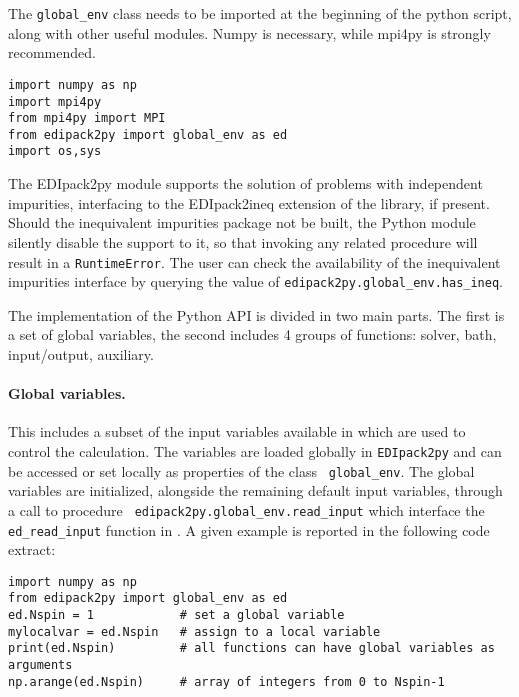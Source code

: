 \documentclass[edipack_sp.tex]{subfiles}
\begin{document}
The {\tt global\_env} class needs to be imported at the beginning
of the python script, along with other useful modules. Numpy is
necessary, while mpi4py is strongly recommended.

\begin{lstlisting}[style=mypython]
import numpy as np
import mpi4py
from mpi4py import MPI
from edipack2py import global_env as ed
import os,sys
\end{lstlisting}

The EDIpack2py module supports the solution of problems with independent
impurities, interfacing to the EDIpack2ineq extension of the
library, if present. Should the inequivalent impurities package not be
built, the Python module silently disable the support to it, so that
invoking any related procedure  will result in a {\tt RuntimeError}.
The user can check the availability of the inequivalent impurities
interface by querying the value of  {\tt edipack2py.global\_env.has\_ineq}.

The implementation of the Python API is divided in two main parts. The
first is a set of global variables, the second includes 4 groups of
functions: solver, bath, input/output, auxiliary. 

\paragraph{{\bf Global variables}.}
This includes a subset of the input variables available in \NAME which
are used to control the calculation.
The variables are loaded globally in {\tt EDIpack2py} and can be accessed
or set locally as properties of the class {\tt
  global\_env}. The global variables are initialized, alongside the remaining
default input variables, through a call to procedure {\tt
  edipack2py.global\_env.read\_input} which interface the {\tt
  ed\_read\_input} function in \NAME. 
A given example is reported in the following code extract:

\begin{lstlisting}[style=mypython]
import numpy as np
from edipack2py import global_env as ed
ed.Nspin = 1            # set a global variable
mylocalvar = ed.Nspin   # assign to a local variable
print(ed.Nspin)         # all functions can have global variables as arguments
np.arange(ed.Nspin)     # array of integers from 0 to Nspin-1
\end{lstlisting}
\end{document}
